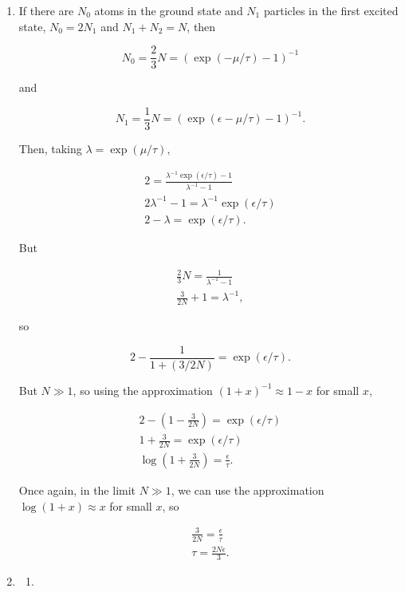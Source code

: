 \documentclass{article}
\begin{document}
\begin{enumerate}
	\item

	If there are $N_0$ atoms in the ground state and $N_1$ particles in the first excited state, $N_0 = 2N_1$ and $N_1 + N_2 = N$, then

	$$N_0 = \frac{2}{3}N = (\exp(-\mu/\tau)-1)^{-1}$$

	and

	$$N_1 = \frac{1}{3}N = (\exp(\epsilon-\mu/\tau)-1)^{-1}.$$

	Then, taking $\lambda = \exp(\mu/\tau),$

	\begin{gather*}
	2 = \frac{\lambda^{-1}\exp(\epsilon/\tau) - 1}{\lambda^{-1} -1} \\
	2\lambda^{-1} - 1 = \lambda^{-1}\exp(\epsilon/\tau) \\
	2 - \lambda = \exp(\epsilon/\tau).
	\end{gather*}

	But

	\begin{gather*}
	\frac{2}{3}N = \frac{1}{\lambda^{-1} - 1} \\ 
	\frac{3}{2N} + 1= \lambda^{-1},
	\end{gather*}

	so

	$$2 - \frac{1}{1 + (3/2N)} = \exp(\epsilon/\tau).$$

	But $N \gg 1$, so using the approximation $(1+x)^{-1} \approx 1-x$ for small $x$,

	\begin{gather*}
	2 - \left( 1 - \frac{3}{2N} \right) = \exp(\epsilon/\tau) \\
	1 + \frac{3}{2N} = \exp(\epsilon / \tau) \\
	\log\left(1 + \frac{3}{2N}\right) = \frac{\epsilon}{\tau}.
	\end{gather*}

	Once again, in the limit $N \gg 1$, we can use the approximation $\log (1+x) \approx x$ for small $x$, so

	\begin{gather*}
	\frac{3}{2N} = \frac{\epsilon}{\tau} \\
	\tau = \frac{2N\epsilon}{3}.
	\end{gather*}


	\item

	\begin{enumerate}

		\item


\end{enumerate}
\end{enumerate}
\end{document}
